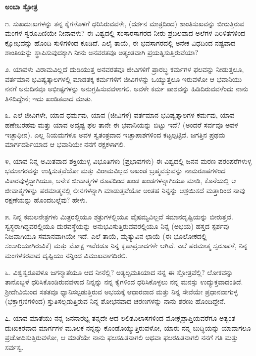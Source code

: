 
\begin{center}
\textbf{ಅಂಬಾ ಸ್ತೋತ್ರ}
\end{center}

೧. ಸುಖದುಃಖಗಳನ್ನು ತನ್ನ ಕೈಗಳೊಳಗೆ ಧರಿಸಿರುವವಳೇ, (ದರ್ಶನ ಮಾತ್ರದಿಂದ) ಶಾಂತಿಸುಖವನ್ನು ಬೀರುತ್ತಿರುವ ಮಂಗಳ ಸ್ವರೂಪಿಣಿಯೇ ನೀನಾವಳು? ಈ ವಿಶ್ವದಲ್ಲಿ ಸಂಸಾರಸಾಗರದ ನೀರು ಪ್ರಬಲವಾದ ಅಲೆಗಳ ಏರಿಳಿತಗಳಿಂದ ಕ್ಷೋಭವನ್ನು ಹೊಂದಿ ಸುಳಿಗಳಿಂದ ಕೂಡಿದೆ. ಎಲೈ ತಾಯೆ, ಈ ಭವಸಾಗರದಲ್ಲಿ ಅನೇಕ ವಿಧದಿಂದ ನಷ್ಟವಾದ ಶಾಂತಿಯನ್ನು ಸ್ಥಾಪಿಸುವುದಕ್ಕಾಗಿ ನೀನು ಅನವರತವೂ ಅತ್ಯಂತವಾಗಿ ಪ್ರಯತ್ನಿಸುತ್ತಿರುವೆಯಾ?

೨. ಯಾವಳು ವಿರಾಮವಿಲ್ಲದೆ ದುಡಿಯುತ್ತ ಅನವರತವೂ ಜೀವಿಗಳಿಗೆ ಪ್ರಾರಬ್ಧ ಕರ್ಮಗಳ ಫಲವನ್ನು ನೀಡುತ್ತಲೂ, ವರ್ತಮಾನ ಭವಿಷ್ಯತ್ಕಾಲಗಳಲ್ಲಿ ಮಾಡತಕ್ಕ ಕರ್ಮಗಳಿಗೆ ಜೀವಿಗಳನ್ನು ಒಯ್ಯುತ್ತಲೂ ಇರುವಳೋ ಆ ಭವಾನಿಯು ನನಗೆ ಅನುದಿನವೂ ಅಭೀಷ್ಟಗಳನ್ನು ಅನುಗ್ರಹಿಸುವವಳಾಗಲಿ. ಅವಳೇ ಕರ್ಮ ಪಾಶವನ್ನು ಹಿಡಿದಿರುವವಳೆಂದು ನಾನು ತಿಳಿದಿದ್ದೇನೆ; ಇದು ಖಂಡಿತವಾದ ಮಾತು.

೩. ಎಲೆ ಜೀವಿಗಳೇ, ಯಾವ ಧರ್ಮವು, ಯಾವ (ಜೀವಿಗಳ) ವರ್ತಮಾನ ಭವಿಷ್ಯತ್ಕಾಲಗಳ ಕರ್ಮವು, ಯಾವ ಹಣೇಬರಹವು ಮತ್ತು ಯಾವ ಅದೃಷ್ಟ ಫಲ ತಾನೇ ಈ ಭವಾನಿಯನ್ನು ಬಿಟ್ಟು ಇದೆ? (ಅಂದರೆ ಸರ್ವವೂ ಅವಳ ಇಚ್ಛಾಧೀನ). ಎಲ್ಲ ನಿಯಮಗಳೂ ಅವಳ ಸ್ವತಂತ್ರವಾದ ಇಚ್ಛಾಪಾಶಗಳಿಂದ ಕಟ್ಟಲ್ಪಟ್ಟಿವೆ. ಜಗತ್ತಿನ ಪ್ರಥಮ ಮಾರ್ಗದರ್ಶಿಯಾದ ಆ ಭವಾನಿಯೇ ನನಗೆ ರಕ್ಷಕಳಾಗಲಿ.

೪, ಯಾವ ನಿನ್ನ ಅಮಿತವಾದ ಶಕ್ತಿಯುಳ್ಳ ವಿಭೂತಿಗಳು (ಪ್ರಭಾವಗಳು) ಈ ವಿಶ್ವದಲ್ಲಿ ಜನನ ಮರಣ ಪರಂಪರೆಗಳುಳ್ಳ ಭವಸಾಗರವನ್ನು ಉಕ್ಕಿಸುತ್ತವೆಯೋ ಮತ್ತು ವಿರಾಮವಿಲ್ಲದ ಅಖಂಡ ಬ್ರಹ್ಮವಸ್ತುವನ್ನು ನಾಮರೂಪಗಳಿಂದ ವಿಕಾರವುಳ್ಳದ್ದಾಗಿಯೂ, ಅನೇಕ ಜೀವಾತ್ಮಗಳ ರೂಪದಿಂದ ಖಂಡ ಖಂಡಗಳನ್ನಾಗಿಯೂ ಮಾಡಿ, ಕೊನೆಯಲ್ಲಿ ಆ ಜೀವಾತ್ಮಗಳನ್ನು ಪರಮಾತ್ಮನಲ್ಲಿ ಲೀನಗಳನ್ನಾಗಿ ಮಾಡುತ್ತವೆಯೋ ಅಂತಹ ನಿನ್ನನ್ನು ಆಶ್ರಯಿಸದೆ ಮತ್ತಾರಿಂದ ನಾವು ರಕ್ಷಣೆಯನ್ನು ಹೊಂದಬಲ್ಲೆವು? ಹೇಳು.

೫. ನಿನ್ನ ಕಮಲನೇತ್ರಗಳು ಮಿತ್ರರಲ್ಲಿಯೂ ಶತ್ರುಗಳಲ್ಲಿಯೂ ವೈಷಮ್ಯವಿಲ್ಲದೆ ಸಮಾನದೃಷ್ಟಿಯನ್ನು ಬೀರುತ್ತವೆ. ಸ್ವಸ್ಥರಾಗಿದ್ದವರಲ್ಲಿಯೂ ದುರವಸ್ಥೆಯನ್ನು ಅನುಭವಿಸುತ್ತಿರುವವರಲ್ಲಿಯೂ ನಿನ್ನ (ಅಭಯ) ಹಸ್ತದ ಸ್ಪರ್ಶವು ನಿಜವಾಗಿಯೂ ಸಮಾನವಾಗಿಯೇ ಇದೆ. ಎಲೆ ತಾಯೆ, ಮೃತ್ಯುವಿನ ಛಾಯೆ (ಈ ಭೂಲೋಕದಲ್ಲಿ ಸಂಸಾರಿಯಾಗಿರುವಿಕೆ) ಮತ್ತು ಮೋಕ್ಷ ಇವೆರಡೂ ನಿನ್ನ ಕೃಪಾಪ್ರಸಾದಗಳೇ ಆಗಿವೆ. ಎಲೆ ಪರಮಾತ್ಮ ಸ್ವರೂಪಳೆ, ನಿನ್ನ ಮಂಗಳಕರವಾದ ದೃಷ್ಟಿಯು ನನ್ನಿಂದ ವಿಮುಖವಾಗದಿರಲಿ.

೬. ವಿಶ್ವಸ್ವರೂಪಳೂ ಜಗನ್ಮಾತೆಯೂ ಆದ ನೀನೆಲ್ಲಿ? ಅತ್ಯಲ್ಪಮತಿಯಾದ ನನ್ನ ಈ ಸ್ತೋತ್ರವೆಲ್ಲಿ? ಲೋಕವನ್ನು ತಾನೊಬ್ಬಳೆ ಧರಿಸಿಕೊಂಡಿರುವವಳಾದ ನಿನ್ನನ್ನು ನನ್ನ ಕೈಗಳಿಂದ ಧರಿಸಿಕೊಳ್ಳಲು ನನ್ನ ಮನಸ್ಸು ಉದ್ಯುಕ್ತವಾದಂತಿದೆ. ಶ‍್ರೀದೇವಿಯಿಂದ ಸತತವೂ ಧ್ಯಾನಿಸಲ್ಪಡುತ್ತಿರುವ ಅಭಯಕ್ಕೆ ಆಧಾರವಾದ ಮತ್ತು ನಿನ್ನ ಸೇವೆಯೇ ಪ್ರಧಾನವಾಗುಳ್ಳ (ಭಕ್ತಾಗ್ರಣಿಗಳಿಂದ) ಸ್ತುತಿಸಲ್ಪಡುತ್ತಿರುವ ನಿನ್ನ ಶೋಭನವಾದ ಚರಣಗಳನ್ನು ನಾನು ಶರಣು ಹೊಂದಿದ್ದೇನೆ.

೭. ಯಾವ ಮಾತೆಯು ನನ್ನ ಜನನಾರಭ್ಯ ತನ್ನದೇ ಆದ ಲಲಿತವಿಲಾಸಗಳಿಂದ ಮೋಕ್ಷಪ್ರಾಪ್ತಿಯವರೆಗೂ ಅತ್ಯಂತ ದುಃಖಕರವಾದ ಮಾರ್ಗಗಳ ಮೂಲಕ ನನ್ನನ್ನು ಕೊಂಡೊಯ್ಯುತ್ತಿರುವಳೋ, ಯಾರು ನನ್ನ ಬುದ್ಧಿಯನ್ನು ಯಾವಾಗಲೂ ಪ್ರಚೋದಿಸುತ್ತಿರುವಳೋ, ಆ ಮಾತೆಯೇ ನಾನು ಫಲಸಹಿತನಾಗಲಿ ಅಥವಾ ಫಲರಹಿತನಾಗಲಿ ನನಗೆ ಗತಿ ಮತ್ತು ಸರ್ವಸ್ವ.

